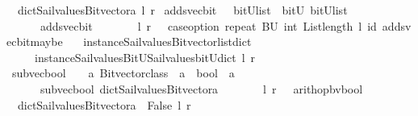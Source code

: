 \begin{isabellebody}
\ \ dict{\isacharunderscore}Sail{}{\isacharunderscore}values{\isacharunderscore}Bitvector{\isacharunderscore}a\ l\ r{\isacharparenright}{\isacharparenright}{\isacharparenright}{\isachardoublequoteclose}\isanewline
\isanewline
{}\isamarkupfalse%
\ adds{\isacharunderscore}vec{\isacharunderscore}bit\ \ {\isacharcolon}{\isacharcolon}\ {\isachardoublequoteopen}{\isacharparenleft}bitU{\isacharparenright}list\ {\isasymRightarrow}\ bitU\ {\isasymRightarrow}{\isacharparenleft}bitU{\isacharparenright}list\ {\isachardoublequoteclose}\ \ \ \isanewline
\ \ \ \ \ {\isachardoublequoteopen}\ adds{\isacharunderscore}vec{\isacharunderscore}bit\ \ \ \ \ \ \ \ l\ r\ {\isacharequal}\ {\isacharparenleft}\ case{\isacharunderscore}option\ {\isacharparenleft}repeat\ {\isacharbrackleft}BU{\isacharbrackright}\ {\isacharparenleft}int\ {\isacharparenleft}List{\isachardot}length\ l{\isacharparenright}{\isacharparenright}{\isacharparenright}\ id\ {\isacharparenleft}adds{\isacharunderscore}vec{\isacharunderscore}bit{\isacharunderscore}maybe\ \isanewline
\ \ {\isacharparenleft}instance{\isacharunderscore}Sail{}{\isacharunderscore}values{\isacharunderscore}Bitvector{\isacharunderscore}list{\isacharunderscore}dict\isanewline
\ \ \ \ \ instance{\isacharunderscore}Sail{}{\isacharunderscore}values{\isacharunderscore}BitU{\isacharunderscore}Sail{}{\isacharunderscore}values{\isacharunderscore}bitU{\isacharunderscore}dict{\isacharparenright}\ l\ r{\isacharparenright}{\isacharparenright}{\isachardoublequoteclose}\isanewline
\isanewline
\isanewline
{}\isamarkupfalse%
\ sub{\isacharunderscore}vec{\isacharunderscore}bool\ \ {\isacharcolon}{\isacharcolon}\ {\isachardoublequoteopen}\ {\isacharprime}a\ Bitvector{\isacharunderscore}class\ {\isasymRightarrow}\ {\isacharprime}a\ {\isasymRightarrow}\ bool\ {\isasymRightarrow}\ {\isacharprime}a\ {\isachardoublequoteclose}\ \ \ \isanewline
\ \ \ \ \ {\isachardoublequoteopen}\ sub{\isacharunderscore}vec{\isacharunderscore}bool\ dict{\isacharunderscore}Sail{}{\isacharunderscore}values{\isacharunderscore}Bitvector{\isacharunderscore}a\ \ \ \ \ \ \ \ l\ r\ {\isacharequal}\ {\isacharparenleft}\ arith{\isacharunderscore}op{\isacharunderscore}bv{\isacharunderscore}bool\ \isanewline
\ \ dict{\isacharunderscore}Sail{}{\isacharunderscore}values{\isacharunderscore}Bitvector{\isacharunderscore}a\ {\isacharparenleft}{\isacharminus}{\isacharparenright}\ False\ l\ r\ {\isacharparenright}{\isachardoublequoteclose}\isanewline

\end{isabellebody}
